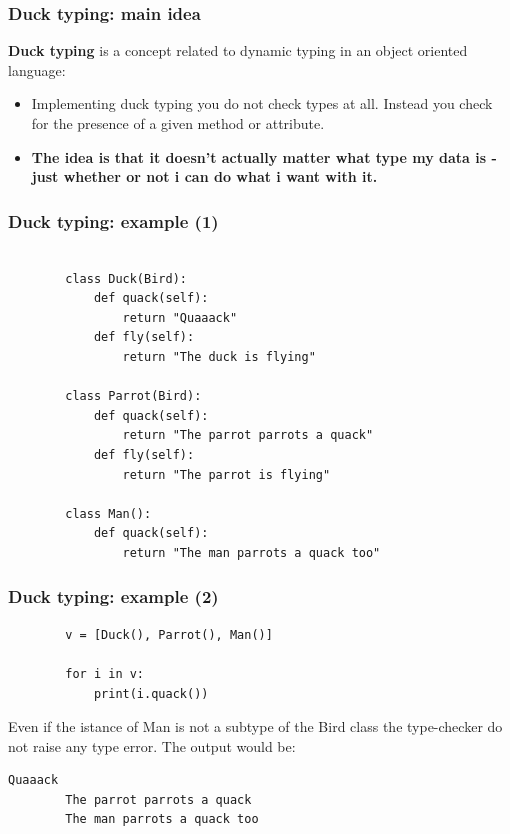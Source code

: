 \documentclass[xcolor ={table,usenames,dvipsnames}]{beamer}
\theoremstyle{definition}
\begin{document}
	\begin{frame}
		\frametitle{Duck typing: main idea}
		\textbf{Duck typing} is a concept related to dynamic typing in an object oriented language:
		\begin{itemize}
			\item Implementing duck typing you do not check types at all. Instead you check for the presence of a given method or attribute.
			\item \textbf{The idea is that it doesn't actually matter what type my data is - just whether or not i can do what i want with it.}
		\end{itemize}
	\end{frame}

	\begin{frame}[fragile]
		\frametitle{Duck typing: example (1)}
		\begin{lstlisting}[]
		
		class Duck(Bird):
			def quack(self):
				return "Quaaack"
			def fly(self):
				return "The duck is flying"
		
		class Parrot(Bird):
			def quack(self):
				return "The parrot parrots a quack"
			def fly(self):
				return "The parrot is flying"
		
		class Man():
			def quack(self):
				return "The man parrots a quack too"

		\end{lstlisting}
	\end{frame}

	\begin{frame}[fragile]
		\frametitle{Duck typing: example (2)}
		\begin{lstlisting}	
		v = [Duck(), Parrot(), Man()]
		
		for i in v:
			print(i.quack())
		\end{lstlisting}
		Even if the istance of Man is not a subtype of the Bird class the type-checker do not raise any type error. The output would be:
		
		\begin{lstlisting}[keywordstyle=\color{black},
		commentstyle=\color{black},
		stringstyle=\color{black}.]	
		Quaaack
		The parrot parrots a quack
		The man parrots a quack too
		\end{lstlisting}
		
		
		
	\end{frame}
\end{document}
